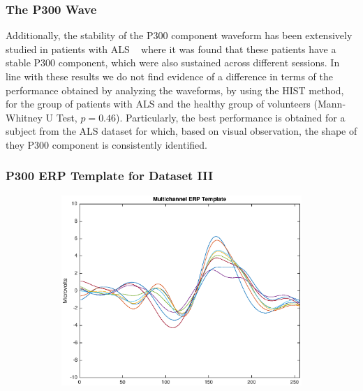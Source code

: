 \documentclass[aspectratio=169]{beamer}
\begin{document}
\begin{frame}
\frametitle{The P300 Wave}
\begin{center}
Additionally, the stability of the P300 component waveform has been extensively studied in patients with ALS ~ where it was found that these patients have a stable P300 component, which were also sustained across different sessions.  In line with these results we do not find evidence of a difference in terms of the performance obtained by analyzing the waveforms, by using the HIST method, for the group of patients with ALS and the healthy group of volunteers (Mann-Whitney U Test, $p=0.46$). Particularly, the best performance is obtained for a subject from the ALS dataset for which, based on visual observation, the shape of they P300 component is consistently identified.
\end{center}
\end{frame} 

\begin{frame}
\frametitle{P300 ERP Template for Dataset III}
\begin{center}
\begin{figure}[h!]
\centering
\includegraphics[height=7.2cm,width=12cm]{images/erptemplate1.eps}
\label{fig:erptemplate1}
\end{figure}
\end{center}
\end{frame} 
\end{document}
